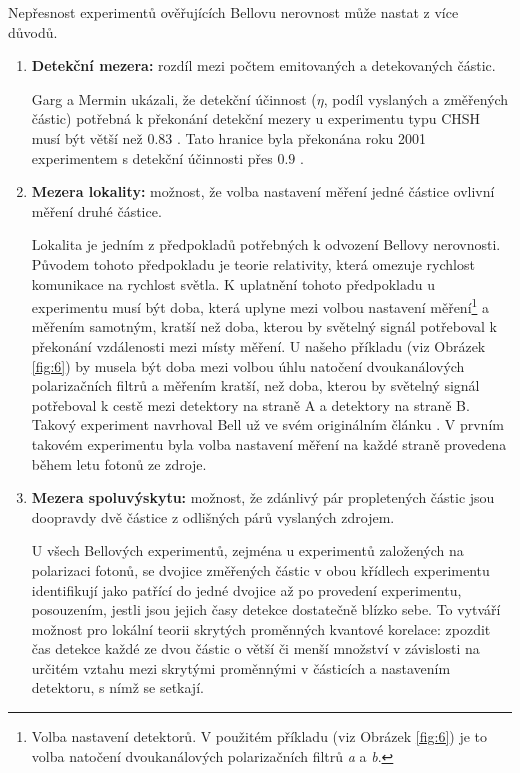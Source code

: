 Nepřesnost experimentů ověřujících Bellovu nerovnost může nastat z více důvodů.
\begin{enumerate}
        \item \textbf{Detekční mezera:} rozdíl mezi počtem emitovaných a detekovaných částic. 

        Garg a Mermin ukázali, že detekční účinnost ($\eta$, podíl vyslaných a změřených částic) potřebná k překonání detekční mezery u experimentu typu CHSH musí být větší než $0.83$ \parencite*{det.efficiency}. Tato hranice byla překonána roku 2001 experimentem s detekční účinnosti přes $0.9$ \parencite{belltest:2001}.

        \item \textbf{Mezera lokality:} možnost, že volba nastavení měření jedné částice ovlivní měření druhé částice.

        Lokalita je jedním z předpokladů potřebných k odvození Bellovy nerovnosti. Původem tohoto předpokladu je teorie relativity, která omezuje rychlost komunikace na rychlost světla. K uplatnění tohoto předpokladu u experimentu musí být doba, která uplyne mezi volbou nastavení měření\footnote[4]{Volba nastavení detektorů. V použitém příkladu (viz Obrázek \ref{fig:6}) je to volba natočení dvoukanálových polarizačních filtrů \emph{a} a \emph{b}.} a měřením samotným, kratší než doba, kterou by světelný signál potřeboval k překonání vzdálenosti mezi místy měření. U našeho příkladu (viz Obrázek \ref{fig:6}) by musela být doba mezi volbou úhlu natočení dvoukanálových polarizačních filtrů a měřením kratší, než doba, kterou by světelný signál potřeboval k cestě mezi detektory na straně A a detektory na straně B. Takový experiment navrhoval Bell už ve svém originálním článku \parencite*{bellineq}. V prvním takovém experimentu \parencite{belltest:2} byla volba nastavení měření na každé straně provedena během letu fotonů ze zdroje.

        \item \textbf{Mezera spoluvýskytu:} možnost, že zdánlivý pár propletených částic jsou doopravdy dvě částice z odlišných párů vyslaných zdrojem.
        
        U všech Bellových experimentů, zejména u experimentů založených na polarizaci fotonů, se dvojice změřených částic v obou křídlech experimentu identifikují jako patřící do jedné dvojice až po provedení experimentu, posouzením, jestli jsou jejich časy detekce dostatečně blízko sebe. To vytváří možnost pro lokální teorii skrytých proměnných  kvantové korelace: zpozdit čas detekce každé ze dvou částic o větší či menší množství v závislosti na určitém vztahu mezi skrytými proměnnými v částicích a nastavením detektoru, s nímž se setkají.


\end{enumerate}
